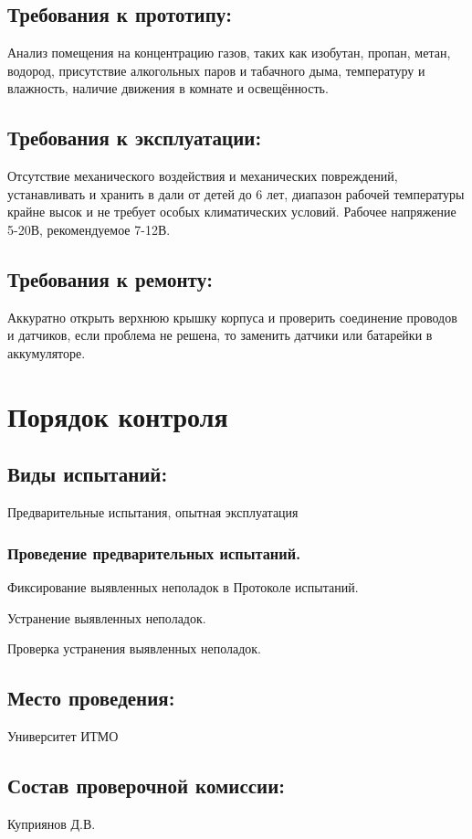 \documentclass[12pt,a4paper]{scrartcl}
\begin{document}
 	\subsection{Требования к прототипу:}
 	Анализ помещения на концентрацию газов, таких как изобутан, пропан, метан, водород, присутствие алкогольных паров и табачного дыма, температуру и влажность, наличие движения в комнате и освещённость.
 	
 	\subsection{Требования к эксплуатации:}
 	Отсутствие механического воздействия и механических повреждений, устанавливать и хранить в дали от детей до 6 лет, диапазон рабочей температуры крайне высок и не требует особых климатических условий. Рабочее напряжение 5-20В, рекомендуемое 7-12В. 
 	
 	\subsection{Требования к ремонту:}
 	Аккуратно открыть верхнюю крышку корпуса и проверить соединение проводов и датчиков, если проблема не решена, то заменить датчики или батарейки в аккумуляторе. 
 	
 	\section{Порядок контроля}
 	\subsection{Виды испытаний:}
 	Предварительные испытания, опытная эксплуатация 
 	
  	\subsubsection{Проведение предварительных испытаний.}
 	
 	Фиксирование выявленных неполадок в Протоколе испытаний.
 	
 	Устранение выявленных неполадок.
 	
 	Проверка устранения выявленных неполадок.
 	\subsection{Место проведения: } Университет ИТМО
 	
 	\subsection{Состав проверочной комиссии:}
 	Куприянов Д.В.
\end{document}
